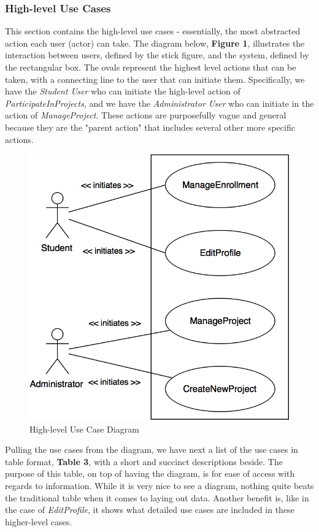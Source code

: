\documentclass[12pt,letterpaper]{article}
\begin{document}
\subsubsection*{High-level Use Cases}

This section contains the high-level use cases - essentially, the most abstracted action each user (actor) can take. The diagram below, {\bf Figure 1}, illustrates the interaction between
users, defined by the stick figure, and the system, defined by the rectangular box. The ovals represent the highest level actions that can be taken, with a connecting line to
the user that can initiate them. Specifically, we have the {\it Student User} who can initiate the high-level action of {\it ParticipateInProjects}, and we have the {\it Administrator User} who can initiate in the action of {\it ManageProject}. These actions are purposefully vague and general because they are the "parent action" that includes several other more specific actions.
\vspace{1em}

\begin{figure}[H]
	\centering{}
	\includegraphics[scale=0.3]{imgs/high-level-use-case-diagram.png}
	\caption{High-level Use Case Diagram}
\end{figure}

Pulling the use cases from the diagram, we have next a list of the use cases in table format, {\bf Table 3}, with a short and succinct descriptions beside. The purpose of this table,
on top of having the diagram, is for ease of access with regards to information. While it is very nice to see a diagram, nothing quite beats the traditional table when
it comes to laying out data. Another benefit is, like in the case of {\it EditProfile}, it shows what detailed use cases are included in these higher-level cases.
\end{document}

